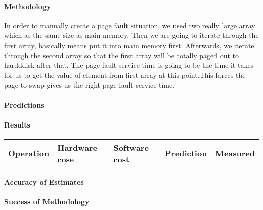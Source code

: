 \paragraph{Methodology}
In order to manually create a page fault situation, we used two really large array which as the same size as main memory. Then we are going to iterate through the first array, basically means put it into main memory first. Afterwards, we iterate through the second array so that the first array will be totally paged out to hardddisk after that. The page fault service time is going to be the time it takes for us to get the value of element from first array at this point.This forces the page to swap gives us the right page fault service time. 
\paragraph{Predictions}
\paragraph{Results}

\begin{center}
\begin{tabular}{| l | l | l | l | l |}
\hline
Operation & Hardware cose & Software cost & Prediction & Measured \\
\hline
\end{tabular}
\end{center}

\paragraph{Accuracy of Estimates}
\paragraph{Success of Methodology}

